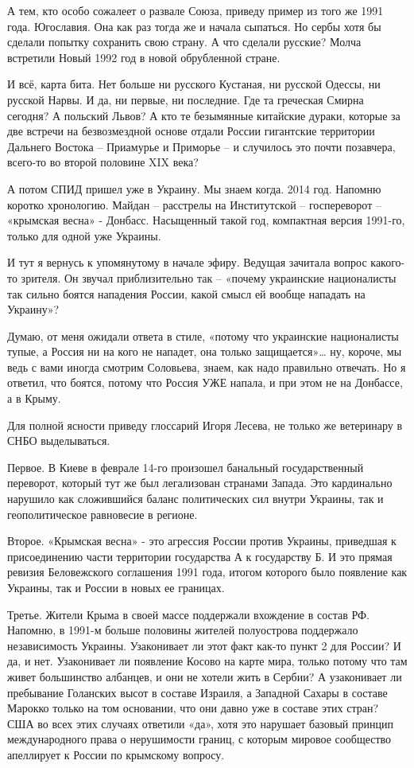 А тем, кто особо сожалеет о развале Союза, приведу пример из того же 1991 года.
Югославия. Она как раз тогда же и начала сыпаться. Но сербы хотя бы сделали
попытку сохранить свою страну. А что сделали русские? Молча встретили Новый
1992 год в новой обрубленной стране.

И всё, карта бита. Нет больше ни русского Кустаная, ни русской Одессы, ни
русской Нарвы. И да, ни первые, ни последние. Где та греческая Смирна сегодня?
А польский Львов? А кто те безымянные китайские дураки, которые за две встречи
на безвозмездной основе отдали России гигантские территории Дальнего Востока –
Приамурье и Приморье – и случилось это почти позавчера, всего-то во второй
половине XIX века?

А потом СПИД пришел уже в Украину. Мы знаем когда. 2014 год. Напомню коротко
хронологию. Майдан – расстрелы на Институтской – госпереворот – «крымская
весна» - Донбасс. Насыщенный такой год, компактная версия 1991-го, только для
одной уже Украины.

И тут я вернусь к упомянутому в начале эфиру. Ведущая зачитала вопрос какого-то
зрителя. Он звучал приблизительно так – «почему украинские националисты так
сильно боятся нападения России, какой смысл ей вообще нападать на Украину»?

Думаю, от меня ожидали ответа в стиле, «потому что украинские националисты
тупые, а Россия ни на кого не нападет, она только защищается»… ну, короче, мы
ведь с вами иногда смотрим Соловьева, знаем, как надо правильно отвечать. Но я
ответил, что боятся, потому что Россия УЖЕ напала, и при этом не на Донбассе, а
в Крыму.

Для полной ясности приведу глоссарий Игоря Лесева, не только же ветеринару в
СНБО выделываться.

Первое. В Киеве в феврале 14-го произошел банальный государственный переворот,
который тут же был легализован странами Запада. Это кардинально нарушило как
сложившийся баланс политических сил внутри Украины, так и геополитическое
равновесие в регионе.

Второе. «Крымская весна» - это агрессия России против Украины, приведшая к
присоединению части территории государства А к государству Б. И это прямая
ревизия Беловежского соглашения 1991 года, итогом которого было появление как
Украины, так и России в новых ее границах.

Третье. Жители Крыма в своей массе поддержали вхождение в состав РФ. Напомню, в
1991-м больше половины жителей полуострова поддержало независимость Украины.
Узаконивает ли этот факт как-то пункт 2 для России? И да, и нет. Узаконивает ли
появление Косово на карте мира, только потому что там живет большинство
албанцев, и они не хотели жить в Сербии? А узаконивает ли пребывание Голанских
высот в составе Израиля, а Западной Сахары в составе Марокко только на том
основании, что они давно уже в составе этих стран? США во всех этих случаях
ответили «да», хотя это нарушает базовый принцип международного права о
нерушимости границ, с которым мировое сообщество апеллирует к России по
крымскому вопросу.


